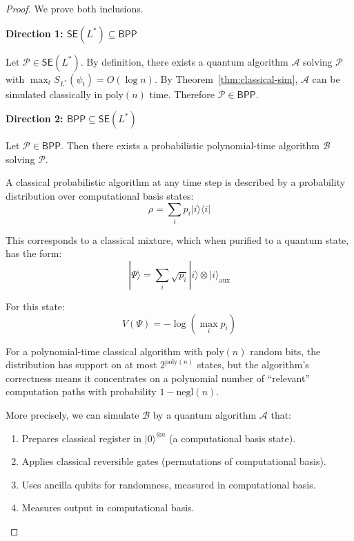 \documentclass[11pt,a4paper]{article}
\theoremstyle{plain}
\theoremstyle{definition}
\theoremstyle{remark}
\newcommand{\ket}[1]{|#1\rangle}
\newcommand{\bra}[1]{\langle#1|}
\newcommand{\BPP}{\mathsf{BPP}}
\newcommand{\SE}{\mathsf{SE}}
\begin{document}
\begin{proof}
We prove both inclusions.

\textbf{Direction 1: $\SE(L^*) \subseteq \BPP$}

Let $\mathcal{P} \in \SE(L^*)$. By definition, there exists a quantum algorithm $\mathcal{A}$ solving $\mathcal{P}$ with $\max_t S_{L^*}(\psi_t) = O(\log n)$. By Theorem~\ref{thm:classical-sim}, $\mathcal{A}$ can be simulated classically in $\text{poly}(n)$ time. Therefore $\mathcal{P} \in \BPP$.

\textbf{Direction 2: $\BPP \subseteq \SE(L^*)$}

Let $\mathcal{P} \in \BPP$. Then there exists a probabilistic polynomial-time algorithm $\mathcal{B}$ solving $\mathcal{P}$.

A classical probabilistic algorithm at any time step is described by a probability distribution over computational basis states:
\begin{equation}
    \rho = \sum_i p_i \ket{i}\bra{i}
\end{equation}

This corresponds to a classical mixture, which when purified to a quantum state, has the form:
\begin{equation}
    \ket{\Psi} = \sum_i \sqrt{p_i} \ket{i} \otimes \ket{i}_{\text{aux}}
\end{equation}

For this state:
\begin{equation}
    V(\Psi) = -\log(\max_i p_i)
\end{equation}

For a polynomial-time classical algorithm with $\text{poly}(n)$ random bits, the distribution has support on at most $2^{\text{poly}(n)}$ states, but the algorithm's correctness means it concentrates on a polynomial number of ``relevant'' computation paths with probability $1 - \text{negl}(n)$.

More precisely, we can simulate $\mathcal{B}$ by a quantum algorithm $\mathcal{A}$ that:
\begin{enumerate}
    \item Prepares classical register in $\ket{0}^{\otimes n}$ (a computational basis state).
    \item Applies classical reversible gates (permutations of computational basis).
    \item Uses ancilla qubits for randomness, measured in computational basis.
    \item Measures output in computational basis.
\end{enumerate}


\end{proof}
\end{document}
